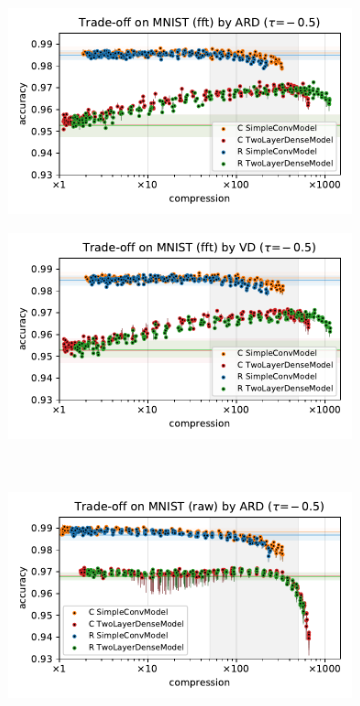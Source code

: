 \documentclass[a4paper,10pt,onecolumn]{article}
\begin{document}
\begin{figure}[b]
\begin{subfigure}[b]{0.5\columnwidth}
    \centering
    \includegraphics[width=\columnwidth]{figure__mnist-like__trade-off/appendix__ARD__mnist__fft__-0.5.pdf}
  \end{subfigure}%
  \begin{subfigure}[b]{0.5\columnwidth}
    \centering
    \includegraphics[width=\columnwidth]{figure__mnist-like__trade-off/appendix__VD__mnist__fft__-0.5.pdf}
  \end{subfigure} \\%
  \begin{subfigure}[b]{0.5\columnwidth}
    \centering
    \includegraphics[width=\columnwidth]{figure__mnist-like__trade-off/appendix__ARD__mnist__raw__-0.5.pdf}

\end{subfigure}
\end{figure}
\end{document}
